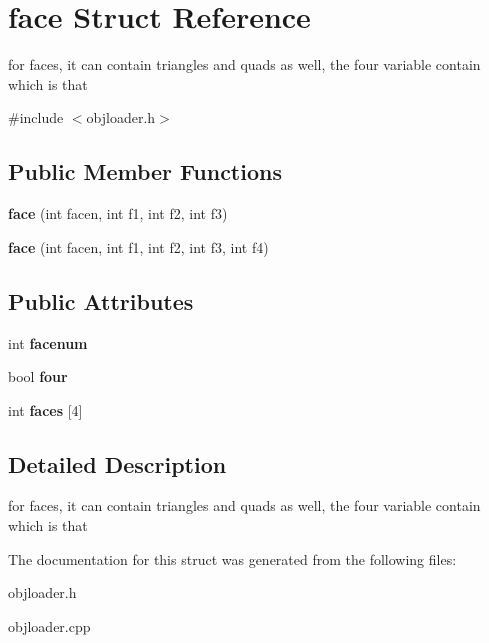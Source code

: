 \hypertarget{structface}{\section{face Struct Reference}
\label{structface}
}


for faces, it can contain triangles and quads as well, the four variable contain which is that  




{\ttfamily \#include $<$objloader.\-h$>$}

\subsection*{Public Member Functions}
\begin{DoxyCompactItemize}
\item 
\hypertarget{structface_a172a779118c75b8cda850442da9b4af2}{{\bfseries face} (int facen, int f1, int f2, int f3)}\label{structface_a172a779118c75b8cda850442da9b4af2}

\item 
\hypertarget{structface_a052e8debe16ccd040e7da94ba2f68243}{{\bfseries face} (int facen, int f1, int f2, int f3, int f4)}\label{structface_a052e8debe16ccd040e7da94ba2f68243}

\end{DoxyCompactItemize}
\subsection*{Public Attributes}
\begin{DoxyCompactItemize}
\item 
\hypertarget{structface_a3b72638c31f93eaa5245a03503eb92a4}{int {\bfseries facenum}}\label{structface_a3b72638c31f93eaa5245a03503eb92a4}

\item 
\hypertarget{structface_a3f3189ee2a2c956b1f5930611b918b31}{bool {\bfseries four}}\label{structface_a3f3189ee2a2c956b1f5930611b918b31}

\item 
\hypertarget{structface_a2cfbc83130f6208094cc1b1e290f7f24}{int {\bfseries faces} \mbox{[}4\mbox{]}}\label{structface_a2cfbc83130f6208094cc1b1e290f7f24}

\end{DoxyCompactItemize}


\subsection{Detailed Description}
for faces, it can contain triangles and quads as well, the four variable contain which is that 

The documentation for this struct was generated from the following files\-:\begin{DoxyCompactItemize}
\item 
objloader.\-h\item 
objloader.\-cpp\end{DoxyCompactItemize}
